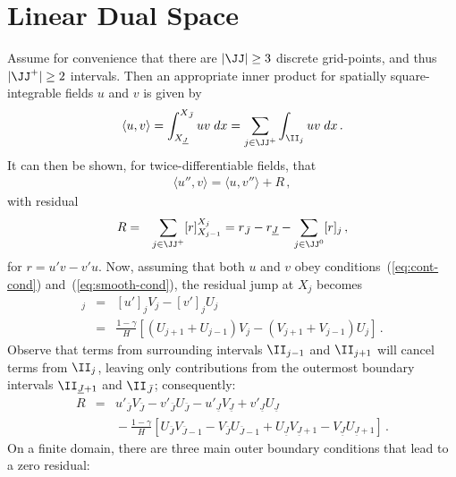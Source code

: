 \documentclass[12pt,a5paper]{article}
\begin{document}
\section{Linear Dual Space}
Assume for convenience that there are $|\JJ|\ge 3$ discrete grid-points, and thus $|\JJ^+|\ge 2$ intervals.
Then an appropriate inner product for spatially square-integrable fields $u$ and $v$ is given by
\begin{eqnarray}
\langle u,v\rangle = \int_{X_{\underline{J}}}^{X_{\bar{J}}}uv\;dx
= \sum_{j\in\JJ^+}\int_{\II_j}uv\;dx\,.
\label{eq:inner}
\end{eqnarray}
It can then be shown, for twice-differentiable fields, that
\begin{eqnarray}
\langle u'',v\rangle =
\langle u,v''\rangle + R\,,
\end{eqnarray}
with residual 
\begin{eqnarray}
R &= & \sum_{j\in\JJ^+}[r]_{X_{j-1}}^{X_j}
= r_{\bar{J}}-r_{\underline{J}}-\sum_{j\in\JJ^0}[r]_j\,,
\end{eqnarray}
for $r=u'v-v'u$.
Now, assuming that both $u$ and $v$ obey conditions~(\ref{eq:cont-cond}) and~(\ref{eq:smooth-cond}), 
the residual jump at $X_j$ becomes
\begin{eqnarray}
[r]_j & = & [u']_j V_j-[v']_j U_j
\nonumber\\
& = & \frac{1-\gamma}{H}\left[
(U_{j+1}+U_{j-1})V_j-(V_{j+1}+V_{j-1})U_j
\right]\,.
\end{eqnarray}
Observe that terms from surrounding intervals $\II_{j-1}$ and $\II_{j+1}$ will cancel terms from $\II_j$, leaving
only contributions from the outermost boundary intervals $\II_{\underline{J}+1}$ and $\II_{\bar{J}}$; consequently:
\begin{eqnarray}
R & = & 
u'_{\bar{J}}V_{\bar{J}}-v'_{\bar{J}}U_{\bar{J}}
-u'_{\underline{J}}V_{\underline{J}}+v'_{\underline{J}}U_{\underline{J}}
\nonumber\\ &&
{}-\frac{1-\gamma}{H}\left[
U_{\bar{J}}V_{\bar{J}-1}-V_{\bar{J}}U_{\bar{J}-1}
+U_{\underline{J}}V_{\underline{J}+1}-V_{\underline{J}}U_{\underline{J}+1}
\right]\,.
\end{eqnarray}
On a finite domain, there are three main outer boundary conditions that lead to a zero residual:
\end{document}
